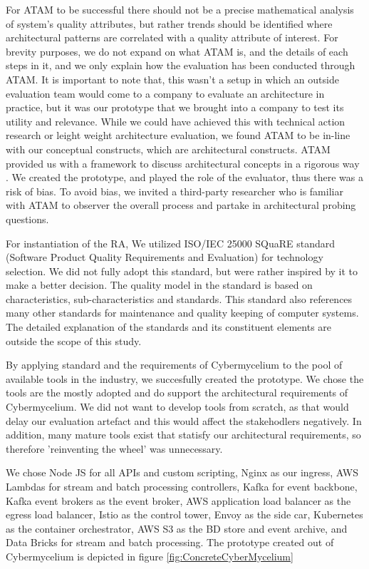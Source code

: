 \documentclass[review]{elsarticle}
\begin{document}
For ATAM to be successful there should not be a precise mathematical analysis of system's quality attributes, but rather trends should be identified where architectural patterns are correlated with a quality attribute of interest. For brevity purposes, we do not expand on what ATAM is, and the details of each steps in it, and we only explain how the evaluation has been conducted through ATAM. It is important to note that, this wasn't a setup in which an outside evaluation team would come to a company to evaluate an architecture in practice, but it was our prototype that we brought into a company to test its utility and relevance. While we could have achieved this with technical action research or leight weight architecture evaluation, we found ATAM to be in-line with our conceptual constructs, which are architectural constructs. ATAM provided us with a framework to discuss architectural concepts in a rigorous way \cite{wieringa2014design}. We created the prototype, and played the role of the evaluator, thus there was a risk of bias. To avoid bias, we invited a third-party researcher who is familiar with ATAM to observer the overall process and partake in architectural probing questions. 

For instantiation of the RA, We utilized ISO/IEC 25000 SQuaRE standard (Software Product Quality Requirements and Evaluation) \cite{ISO25000} for technology selection.  We did not fully adopt this standard, but were rather inspired by it to make a better decision. The quality model in the standard is based on characteristics, sub-characteristics and standards. This standard also references many other standards for maintenance and quality keeping of computer systems. The detailed explanation of the standards and its constituent elements are outside the scope of this study.

By applying standard and the requirements of Cybermycelium to the pool of available tools in the industry, we succesfully created the prototype. We chose the tools are the mostly adopted and do support the architectural requirements of Cybermycelium. We did not want to develop tools from scratch, as that would delay our evaluation artefact and this would affect the stakehodlers negatively. In addition, many mature tools exist that statisfy our architectural requirements, so therefore 'reinventing the wheel' was unnecessary.

We chose Node JS for all APIs and custom scripting, Nginx as our ingress, AWS Lambdas for stream and batch processing controllers, Kafka for event backbone, Kafka event brokers as the event broker, AWS application load balancer as the egress load balancer, Istio as the control tower, Envoy as the side car, Kubernetes as the container orchestrator, AWS S3 as the BD store and event archive, and Data Bricks for stream and batch processing. The prototype created out of Cybermycelium is depicted in figure \ref{fig:ConcreteCyberMycelium}
\end{document}
